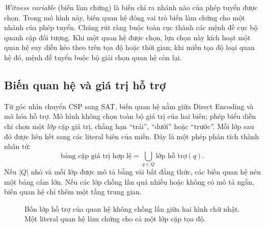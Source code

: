 \emph{Witness variable} (biến làm chứng) là biến chỉ ra nhánh nào của phép
tuyển được chọn. Trong mô hình này, biến quan hệ đóng vai trò biến làm chứng
cho một nhánh của phép tuyển. Chúng rút
ràng buộc toàn cục thành các mệnh đề cục bộ quanh cặp đối tượng. Khi một quan
hệ được chọn, lựa chọn này kích hoạt một quan hệ suy diễn kéo theo trên tọa độ hoặc thời gian; khi
miền tọa độ loại quan hệ đó, mệnh đề tuyển buộc bộ giải chọn quan hệ còn lại.

\subsection{Biến quan hệ và giá trị hỗ trợ}

Từ góc nhìn chuyển CSP sang SAT, biến quan hệ nằm giữa Direct Encoding và mã
hóa hỗ trợ. Mô hình không chọn toàn bộ giá trị của hai biến; phép biểu diễn chỉ chọn một
\emph{lớp} cặp giá trị,
chẳng hạn ``trái'', ``dưới'' hoặc ``trước''. Mỗi lớp sau đó được liên kết sang
các literal biên của miền. Đây là một phép phân tích thành nhân tử:
\[
  \text{bảng cặp giá trị hợp lệ}
  =
  \bigcup_{q\in Q}\text{lớp hỗ trợ}(q).
\]
Nếu \(|Q|\) nhỏ và mỗi lớp được mô tả bằng vài bất đẳng thức, các biến quan hệ
nén một bảng cấm lớn. Nếu các lớp chồng lấn quá nhiều hoặc không
có mô tả ngắn, biến quan hệ chỉ thêm một tầng trung gian.

\begin{figure}[tb]
\centering
{}
\caption{Bốn lớp hỗ trợ của quan hệ không chồng lấn giữa hai hình chữ nhật.
Một literal quan hệ làm chứng cho cả một lớp cặp tọa độ.}
\label{fig:four-spatial-relations}
\end{figure}

